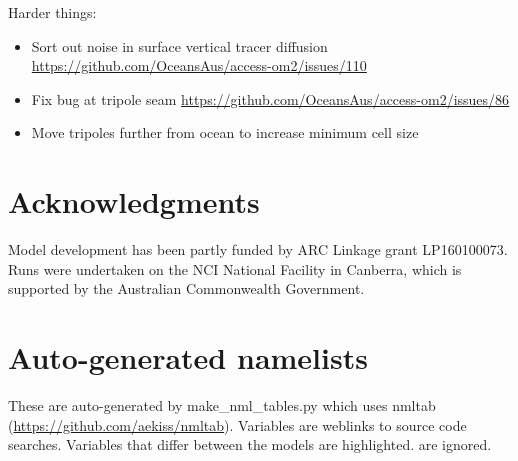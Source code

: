 \documentclass[11pt]{article}
\newcommand{\nmldiffer}[1]{#1} %
\newcommand{\nmllink}[2]{#1} %
\newcommand{\nml}[1]{{\footnotesize\textsf{}}}
\newlength{\nmllen}\setlength{\nmllen}{8ex}
\begin{document}
Harder things:
\begin{itemize}
\item Sort out noise in surface vertical tracer diffusion \url{https://github.com/OceansAus/access-om2/issues/110}
\item Fix bug at tripole seam \url{https://github.com/OceansAus/access-om2/issues/86}
\item Move tripoles further from ocean to increase minimum cell size
\end{itemize}
 
 \section{Acknowledgments}
Model development has been partly funded by ARC Linkage grant LP160100073.
Runs were undertaken on the NCI National Facility in Canberra, which is supported by the Australian Commonwealth Government.

\appendix
\section{Auto-generated namelists}


\renewcommand{\nmldiffer}[1]{\colorbox{hilite}{#1}}\setlength{\fboxsep}{0pt} %
\renewcommand{\nmllink}[2]{#1} %
\renewcommand{\nml}[1]{{\small\textsf{}}} %

These are auto-generated by make\_nml\_tables.py which uses nmltab (\url{https://github.com/aekiss/nmltab}).
Variables are weblinks to source code searches. 
Variables that differ between the models are \nmldiffer{\textcolor{link}{highlighted}}.
 are ignored. %
\end{document}
